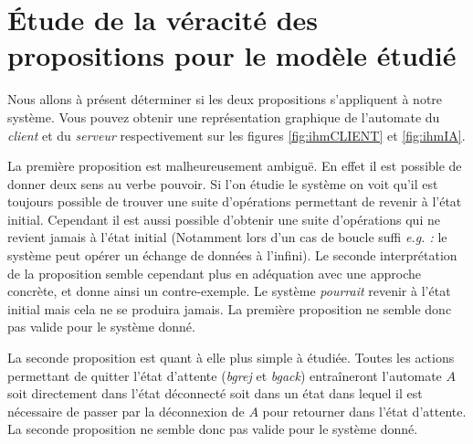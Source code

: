 \section{Étude de la véracité des propositions pour le modèle étudié}
Nous allons à présent déterminer si les deux propositions s'appliquent à notre système. Vous pouvez obtenir une représentation graphique de l'automate du \emph{client} et du \emph{serveur} respectivement sur les figures \ref{fig:ihmCLIENT} et \ref{fig:ihmIA}.

La première proposition est malheureusement ambiguë. En effet il est possible de donner deux sens au verbe pouvoir. Si l'on étudie le système on voit qu'il est toujours possible de trouver une suite d'opérations permettant de revenir à l'état initial. Cependant il est aussi possible d'obtenir une suite d'opérations qui ne revient jamais à l'état initial (Notamment lors d'un cas de boucle suffi \emph{e.g. :} le système peut opérer un échange de données à l'infini).
Le seconde interprétation de la proposition semble cependant plus en adéquation avec une approche concrète, et donne ainsi un contre-exemple. Le système \emph{pourrait} revenir à l'état initial mais cela ne se produira jamais. La première proposition ne semble donc pas valide pour le système donné.

La seconde proposition est quant à elle plus simple à étudiée. Toutes les actions permettant de quitter l'état d'attente (\emph{bgrej} et \emph{bgack}) entraîneront l'automate $A$ soit directement dans l'état déconnecté soit dans un état dans lequel il est nécessaire de passer par la déconnexion de $A$ pour retourner dans l'état d'attente.  La seconde proposition ne semble donc pas valide pour le système donné.




